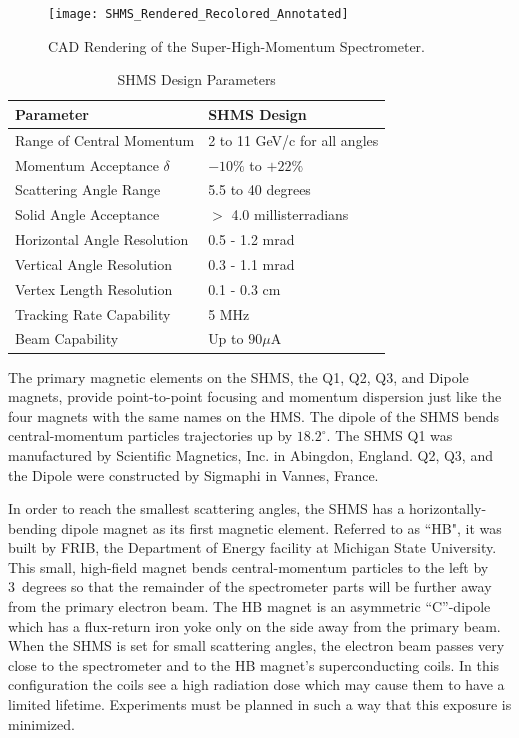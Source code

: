 {\begin{figure}
\texttt{[image: SHMS\_Rendered\_Recolored\_Annotated]}
\caption{CAD Rendering of the Super-High-Momentum Spectrometer. \label{fig:SHMS_CAD_Model}}
\end{figure}

\begin{table}
\begin{center}
\caption{SHMS Design Parameters\label{tab:shms_specs}}
\vspace{\baselineskip}
\begin{tabular}{|l|l|} 
\hline
Parameter						& SHMS Design 			\\ \hline
Range of Central Momentum		& 2 to 11 GeV/c for all angles	\\
Momentum Acceptance $\delta$	& $-10\%$ to $+22\%$			\\
Scattering Angle Range			& 5.5 to 40 degrees			\\
Solid Angle Acceptance			& $>$ 4.0 millisterradians		\\
Horizontal Angle Resolution		& 0.5 - 1.2 mrad			\\
Vertical Angle Resolution			& 0.3 - 1.1 mrad			\\
Vertex Length Resolution			& 0.1 - 0.3 cm				\\
Tracking Rate Capability			& 5 MHz					\\
Beam Capability				& Up to $90 \mu$A			\\
\hline
\end{tabular}
\end{center}
\end{table}


The primary magnetic elements on the SHMS, the Q1, Q2, Q3, and Dipole magnets, provide
point-to-point focusing and momentum dispersion just like the four magnets with
the same names on the HMS. The dipole of the SHMS bends central-momentum particles
trajectories up by $18.2^{\circ}$. The SHMS Q1 was 
manufactured by Scientific Magnetics, Inc. in Abingdon, England. Q2, Q3, and
the Dipole were constructed by Sigmaphi in Vannes, France.

In order to reach the smallest scattering angles, the SHMS has a horizontally-bending dipole
magnet as its first magnetic element. Referred to as ``HB", it was built by FRIB, the Department of Energy
facility at Michigan State  University. This small, high-field magnet bends
central-momentum particles to the left by 3~degrees so that the remainder of the
spectrometer parts will be further away from the primary electron beam. The HB
magnet is an asymmetric ``C''-dipole which has a flux-return iron yoke only on
the side away from the primary beam. When the SHMS is set for small scattering 
angles, the electron beam passes very close to the spectrometer and to the
HB magnet's superconducting
coils. In this configuration the coils see a high radiation dose which may cause
them to have a limited 
lifetime. Experiments must be planned in such a way that this exposure is minimized.

}
